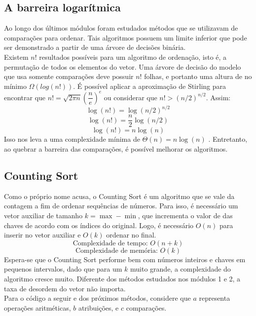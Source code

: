 \documentclass[fontsize=11pt]{article}
\begin{document}
    \subsection{A barreira logarítmica}
        Ao longo dos últimos módulos foram estudados métodos que se utilizavam de comparações
        para ordenar. Tais algoritmos possuem um limite inferior que pode ser demonstrado a 
        partir de uma árvore de decisões binária. \Cite{mitclass} 
        \\Existem $n!$ resultados possíveis para um algoritmo de ordenação, isto é, a permutação de
        todos os elementos do vetor. Uma árvore de decisão do modelo que usa somente comparações
        deve possuir $n!$ folhas, e portanto uma altura de no mínimo 
        $\Omega(log(n!))$. É possível aplicar a aproximação de Stirling para encontrar
        que $n! = \sqrt{2 \pi n}(\dfrac{n}{e})^e$ ou considerar que $n!>(n/2)^{n/2}$. Assim:
        $$\log(n!) = \log(n/2)^{n/2}$$
        $$\log(n!) = \dfrac{n}{2}\log(n/2)$$
        $$\log(n!) = n\log(n)$$
        Isso nos leva a uma complexidade mínima de $\Theta(n)=n\log(n)$ \cite{mitvideo}.
        Entretanto, ao quebrar a barreira das comparações, é possível melhorar os algoritmos. 
        \subsection{Counting Sort}
        Como o próprio nome acusa, o Counting Sort é um algoritmo que se vale da contagem 
        a fim de ordenar sequências de números. Para isso, é necessário um vetor
        auxiliar de tamanho $k = \max - \min$, que incrementa o valor de das chaves
        de acordo com os índices do original. Logo, é necessário $O(n)$ para inserir 
        no vetor auxiliar e $O(k)$ ordenar no final.
        $$\text{Complexidade de tempo: } O(n+k)$$
        $$\text{Complexidade de memória: } O(k)$$
        Espera-se que o Counting Sort performe bem com números inteiros e chaves em
        pequenos intervalos, dado que para um $k$ muito grande, a complexidade do 
        algoritmo cresce muito. Diferente dos métodos estudados nos módulos 1 e 2, 
        a taxa de desordem do vetor não importa.
        \\Para o código a seguir e dos próximos métodos, considere que 
        $a$ representa operações aritméticas, $b$ atribuições, e $c$ comparações.
        
\end{document}
